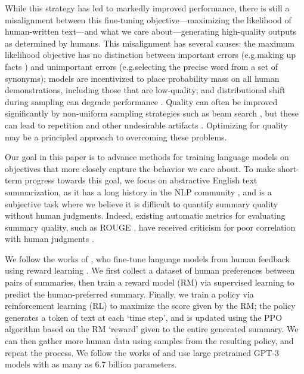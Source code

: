 While this strategy has led to markedly improved performance, there is still a misalignment between this fine-tuning objective---maximizing the likelihood of human-written text---and what we care about---generating high-quality outputs as determined by humans. This misalignment has several causes: the maximum likelihood objective has no distinction between important errors (e.g.\@ making up facts \cite{hallucination}) and unimportant errors (e.g.\@ selecting the precise word from a set of synonyms); models are incentivized to place probability mass on all  human demonstrations, including those that are low-quality; and distributional shift during sampling can degrade performance \cite{generalization, dagger}. Quality can often be improved significantly by non-uniform sampling strategies such as beam search \cite{reddy1977speech}, but these can lead to repetition and other undesirable artifacts \cite{tradingoff, degeneration}. Optimizing for quality may be a principled approach to overcoming these problems.


Our goal in this paper is to advance methods for training language models on objectives that more closely capture the behavior we care about. To make short-term progress towards this goal, we focus on abstractive English text summarization, as it has a long history in the NLP community \cite{dorr2003hedge,chopra2016abstractive,rush2015neural,see2017get,ranzato2015sequence}, and is a subjective task where we believe it is difficult to quantify summary quality without human judgments. Indeed, existing automatic metrics for evaluating summary quality, such as ROUGE \cite{lin2004automatic}, have received criticism for poor correlation with human judgments \cite{schluter2017limits,paulus2017deep,chaganty2018price,kryscinski2019neural}. 

We follow the works of \cite{bohm2019better,ziegler2019fine}, who fine-tune language models from human feedback using reward learning \cite{leike2018scalable}. We first collect a dataset of human preferences between pairs of summaries, then train a reward model (RM) via supervised learning to predict the human-preferred summary. Finally, we train a policy via reinforcement learning (RL) to maximize the score given by the RM; the policy generates a token of text at each `time step', and is updated using the PPO algorithm \cite{schulman2017proximal} based on the RM `reward' given to the entire generated summary. We can then gather more human data using samples from the resulting policy, and repeat the process. We follow the works of \cite{radford2019language,brown2020language} and use large pretrained GPT-3 models with as many as 6.7 billion parameters.  

